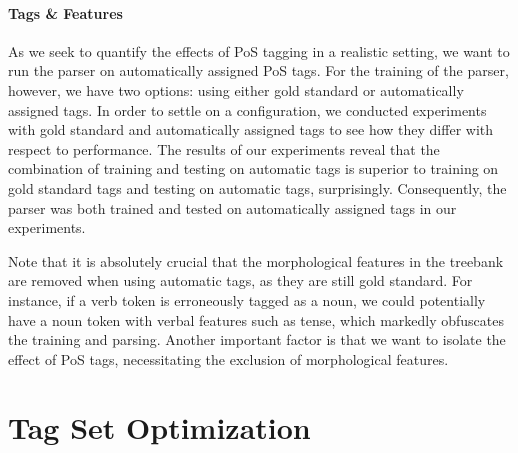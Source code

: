 \documentclass[11pt]{article}
\begin{document}
\paragraph{Tags \& Features}
As we seek to quantify the effects of PoS tagging in a realistic setting, we
want to run the parser on automatically assigned PoS tags. For the training of
the parser, however, we have two options: using either gold standard or
automatically assigned tags. In order to settle on a configuration, we
conducted experiments with gold standard and automatically assigned tags to see
how they differ with respect to performance. The results of our experiments
reveal that the combination of training and testing on automatic tags is
superior to training on gold standard tags and testing on automatic tags,
surprisingly. Consequently, the parser was both trained and tested on
automatically assigned tags in our experiments.

Note that it is absolutely crucial that the morphological features in the
treebank are removed when using automatic tags, as they are still gold
standard. For instance, if a verb token is erroneously tagged as a noun, we
could potentially have a noun token with verbal features such as tense, which
markedly obfuscates the training and parsing. Another important factor is that
we want to isolate the effect of PoS tags, necessitating the exclusion of
morphological features.

\section{Tag Set Optimization}
\label{sec:optimization}
\end{document}
